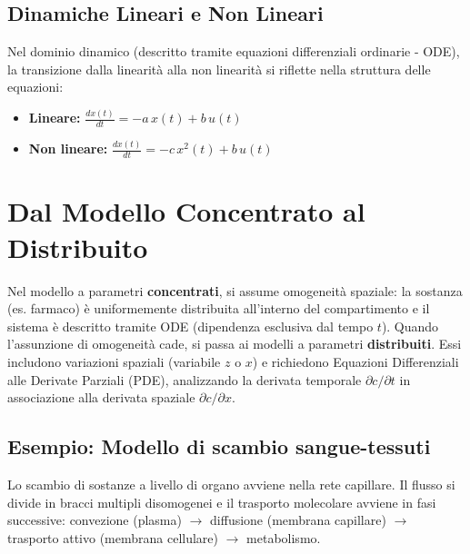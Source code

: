 \subsection{Dinamiche Lineari e Non Lineari}
Nel dominio dinamico (descritto tramite equazioni differenziali ordinarie - ODE), la transizione dalla linearità alla non linearità si riflette nella struttura delle equazioni:
\begin{itemize}
    \item \textbf{Lineare:} $\frac{dx(t)}{dt} = -a \, x(t) + b \, u(t)$
    \item \textbf{Non lineare:} $\frac{dx(t)}{dt} = -c \, x^2(t) + b \, u(t)$
\end{itemize}

\section{Dal Modello Concentrato al Distribuito}
Nel modello a parametri \textbf{concentrati}, si assume omogeneità spaziale: la sostanza (es. farmaco) è uniformemente distribuita all'interno del compartimento e il sistema è descritto tramite ODE (dipendenza esclusiva dal tempo $t$).
Quando l'assunzione di omogeneità cade, si passa ai modelli a parametri \textbf{distribuiti}. Essi includono variazioni spaziali (variabile $z$ o $x$) e richiedono Equazioni Differenziali alle Derivate Parziali (PDE), analizzando la derivata temporale $\partial c / \partial t$ in associazione alla derivata spaziale $\partial c / \partial x$.

\subsection{Esempio: Modello di scambio sangue-tessuti}
Lo scambio di sostanze a livello di organo avviene nella rete capillare. Il flusso si divide in bracci multipli disomogenei e il trasporto molecolare avviene in fasi successive: convezione (plasma) $\to$ diffusione (membrana capillare) $\to$ trasporto attivo (membrana cellulare) $\to$ metabolismo.

